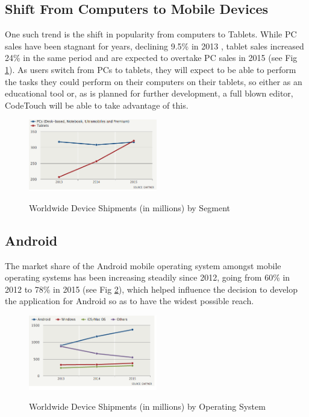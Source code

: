 \documentclass[ %
                    author={Jonathan Rankin},
                supervisor={Dr. David May, Dr. Ian Holyer},
                    degree={MEng},
                     title={CodeTouch},
                  subtitle={A Revolutionary Way To Program Real Code On Touch Screen Devices},
                      type={enterprise},
                      year={2015 } ]{dissertation}
\begin{document}
\subsection{Shift From Computers to Mobile Devices}%
One such trend is the shift in popularity from computers to Tablets. While PC sales have been stagnant for years, declining 9.5\% in 2013 \cite{tabletOvertake}, tablet sales increased 24\% in the same period and are expected to overtake PC sales in 2015 \cite{tabletOvertake}(see Fig \ref{fig:tabVsPC}). As users switch from PCs to tablets, they will expect to be able to perform the tasks they could perform on their computers on their tablets, so either as an educational tool or, as is planned for further development, a full blown editor, CodeTouch will be able to take advantage of this.
\begin{figure}[h]
\centering
\includegraphics[width=0.50\textwidth]{tabletVsPC}
\label{fig:tabVsPC}
\caption{Worldwide Device Shipments (in millions) by Segment \cite{tabletOvertake}}
\end{figure}



\subsection{Android}\label{sec:Android}
The market share of the Android mobile operating system amongst mobile operating systems has been increasing steadily since 2012, going from 60\% in 2012 to 78\% in 2015 (see Fig \ref{fig:android}), which helped influence the decision to develop the application for Android so as to have the widest possible reach.

\begin{figure}[h]
\centering
\includegraphics[width=0.50\textwidth]{android}\label{fig:android}\caption{Worldwide Device Shipments (in millions) by Operating System \cite{tabletOvertake}}
\end{figure}
\end{document}
